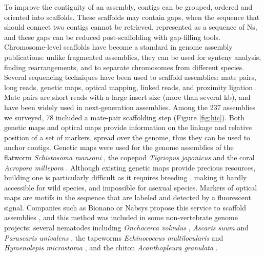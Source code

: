 To improve the contiguity of an assembly, contigs can be grouped, ordered and oriented into scaffolds. These scaffolds may contain gaps, when the sequence that should connect two contigs cannot be retrieved, represented as a sequence of Ns, and these gaps can be reduced post-scaffolding with gap-filling tools. Chromosome-level scaffolds have become a standard in genome assembly publications: unlike fragmented assemblies, they can be used for synteny analysis, finding rearrangements, and to separate chromosomes from different species. Several sequencing techniques have been used to scaffold assemblies: mate pairs, long reads, genetic maps, optical mapping, linked reads, and proximity ligation \cite{ghurye2019modern}. Mate pairs are short reads with a large insert size (more than several kb), and have been widely used in next-generation assemblies. Among the 237 assemblies we surveyed, 78 included a mate-pair scaffolding step (Figure \ref{fig:hic}). Both genetic maps \cite{genetic_maps} and optical maps \cite{optical_maps} provide information on the linkage and relative position of a set of markers, spread over the genome, thus they can be used to anchor contigs. Genetic maps were used for the genome assemblies of the flatworm \textit{Schistosoma mansoni} \cite{schistosoma_mansoni2}, the copepod \textit{Tigriopus japonicus} \cite{tigriopus_japonicus} and the coral \textit{Acropora millepora} \cite{acropora_millepora2}. Although existing genetic maps provide precious resources, building one is particularly difficult as it requires breeding \cite{genetic_maps}, making it hardly accessible for wild species, and impossible for asexual species. Markers of optical maps are motifs in the sequence that are labeled and detected by a fluorescent signal. Companies such as Bionano or Nabsys propose this service to scaffold assemblies \cite{optical_scaffolding}, and this method was included in some non-vertebrate genome projects: several nematodes including \textit{Onchocerca volvulus} \cite{onchocerca_volvulus}, \textit{Ascaris suum} and \textit{Parascaris univalens} \cite{ascaris_suum2}, the tapeworms \textit{Echinococcus multilocularis} \cite{echinococcus_multilocularis} and \textit{Hymenolepis microstoma} \cite{hymenolepis_microstoma2}, and the chiton \textit{Acanthopleura granulata} \cite{acanthopleura_granulata}. \\

